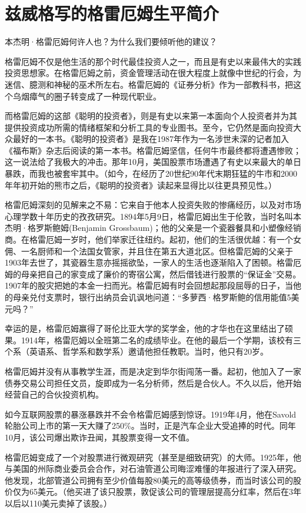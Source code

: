 \documentclass[12pt,oneside]{book}
\begin{document}
\section{兹威格写的格雷厄姆生平简介}
本杰明·格雷厄姆何许人也？为什么我们要倾听他的建议？

格雷厄姆不仅是他生活的那个时代最佳投资人之一，而且是有史以来最伟大的实践投资思想家。在格雷厄姆之前，资金管理活动在很大程度上就像中世纪的行会，为迷信、臆测和神秘的巫术所左右。格雷厄姆的《证券分析》作为一部教科书，把这个乌烟瘴气的圈子转变成了一种现代职业。

而格雷厄姆的这部《聪明的投资者》，则是有史以来第一本面向个人投资者并为其提供投资成功所需的情绪框架和分析工具的专业图书。至今，它仍然是面向投资大众最好的一本书。《聪明的投资者》是我在1987年作为一名涉世未深的记者加入《福布斯》杂志后阅读的第一本书。格雷厄姆坚信，任何牛市最终都将遭遇惨败；这一说法给了我极大的冲击。那年10月，美国股票市场遭遇了有史以来最大的单日暴跌，而我也被套牢其中。（如今，在经历了20世纪90年代末期狂猛的牛市和2000年年初开始的熊市之后，《聪明的投资者》读起来显得比以往更具预见性。）

格雷厄姆深刻的见解来之不易：它来自于他本人投资失败的惨痛经历，以及对市场心理学数十年历史的孜孜研究。1894年5月9日，格雷厄姆出生于伦敦，当时名叫本杰明·格罗斯鲍姆(Benjamin Grossbaum)；他的父亲是一个瓷器餐具和小塑像经销商。在格雷厄姆一岁时，他们举家迁往纽约。起初，他们的生活很优越：有一个女佣、一名厨师和一个法国女管家，并且住在第五大道北区。但格雷厄姆的父亲于1903年去世了，其瓷器生意亦摇摇欲坠，一家人的生活也逐渐陷入了困顿。格雷厄姆的母亲把自己的家变成了廉价的寄宿公寓，然后借钱进行股票的“保证金”交易。1907年的股灾把她的本金一扫而光。格雷厄姆有时会回想起那段屈辱的日子，当他的母亲兑付支票时，银行出纳员会讥讽地问道：“多萝西·格罗斯鲍的信用能值5美元吗？”

幸运的是，格雷厄姆赢得了哥伦比亚大学的奖学金，他的才华也在这里结出了硕果。1914年，格雷厄姆以全班第二名的成绩毕业。在他的最后一个学期，该校有三个系（英语系、哲学系和数学系）邀请他担任教职。当时，他只有20岁。

格雷厄姆并没有从事教学生涯，而是决定到华尔街闯荡一番。起初，他加入了一家债券交易公司担任文员，旋即成为一名分析师，然后是合伙人。不久以后，他开始经营自己的合伙投资机构。

如今互联网股票的暴涨暴跌并不会令格雷厄姆感到惊讶。1919年4月，他在Savold轮胎公司上市的第一天大赚了250\%。当时，正是汽车企业大受追捧的时代。同年10月，该公司爆出欺诈丑闻，其股票变得一文不值。

格雷厄姆变成了一个对股票进行微观研究（甚至是细致研究）的大师。1925年，他与美国的州际商业委员会合作，对石油管道公司晦涩难懂的年报进行了深入研究。他发现，北部管道公司拥有至少价值每股80美元的高等级债券，而当时该公司的股价仅为65美元。（他买进了该只股票，敦促该公司的管理层提高分红率，然后在3年以后以110美元卖掉了该股。）
\end{document}
